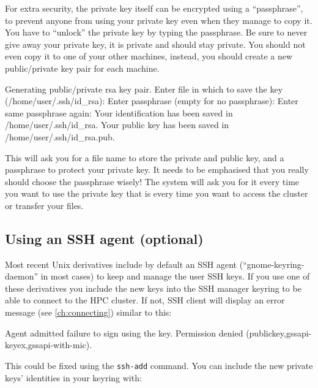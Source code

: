   For extra security, the private key itself can be encrypted using a ``passphrase'',
  to prevent anyone from using your private key even when they manage to copy
  it. You have to ``unlock'' the private key by typing the passphrase.
  Be sure to never give away your private key, it is private and should stay private.
  You should not even copy it to one of your other machines, instead, you should create a
  new public/private key pair for each machine.

\begin{prompt}
Generating public/private rsa key pair.
Enter file in which to save the key (/home/user/.ssh/id_rsa):
Enter passphrase (empty for no passphrase):
Enter same passphrase again:
Your identification has been saved in /home/user/.ssh/id_rsa.
Your public key has been saved in /home/user/.ssh/id_rsa.pub.
\end{prompt}

  This will ask you for a file name to store the private and public key, and a
  passphrase to protect your private key. It needs to be emphasised that you
  really should choose the passphrase wisely! The system will ask you for it
  every time you want to use the private key that is every time you want to
  access the cluster or transfer your files.

\fi %

\ifmacORlinux

\subsection{Using an SSH agent (optional)}
\label{sec:using-ssh-agent-with-openssh}
  Most recent Unix derivatives include by default an SSH agent
  \iflinux(``gnome-keyring-daemon'' in most cases) \fi to keep and manage the user SSH keys.
  If you use one of these derivatives you  include the new keys into
  the SSH manager keyring to be able to connect to the HPC cluster. If not,
  SSH client will display an error message (see \autoref{ch:connecting})
  similar to this:

  \begin{flattext}
   Agent admitted failure to sign using the key.
   Permission denied (publickey,gssapi-keyex,gssapi-with-mic).
  \end{flattext}

  This could be fixed using the \lstinline|ssh-add| command.
  You can include the new private keys' identities in your keyring with:

